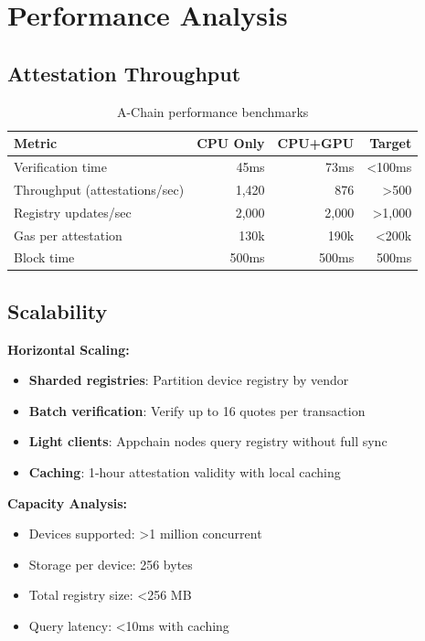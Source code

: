 \section{Performance Analysis}


\subsection{Attestation Throughput}

\begin{table}[h]
\centering
\begin{tabular}{@{}lrrr@{}}
\toprule
\textbf{Metric} & \textbf{CPU Only} & \textbf{CPU+GPU} & \textbf{Target} \\ \midrule
Verification time & 45ms & 73ms & <100ms \\
Throughput (attestations/sec) & 1,420 & 876 & >500 \\
Registry updates/sec & 2,000 & 2,000 & >1,000 \\
Gas per attestation & 130k & 190k & <200k \\
Block time & 500ms & 500ms & 500ms \\ \bottomrule
\end{tabular}
\caption{A-Chain performance benchmarks}
\end{table}

\subsection{Scalability}

\textbf{Horizontal Scaling:}
\begin{itemize}
\item \textbf{Sharded registries}: Partition device registry by vendor
\item \textbf{Batch verification}: Verify up to 16 quotes per transaction
\item \textbf{Light clients}: Appchain nodes query registry without full sync
\item \textbf{Caching}: 1-hour attestation validity with local caching
\end{itemize}

\textbf{Capacity Analysis:}
\begin{itemize}
\item Devices supported: >1 million concurrent
\item Storage per device: 256 bytes
\item Total registry size: <256 MB
\item Query latency: <10ms with caching
\end{itemize}

